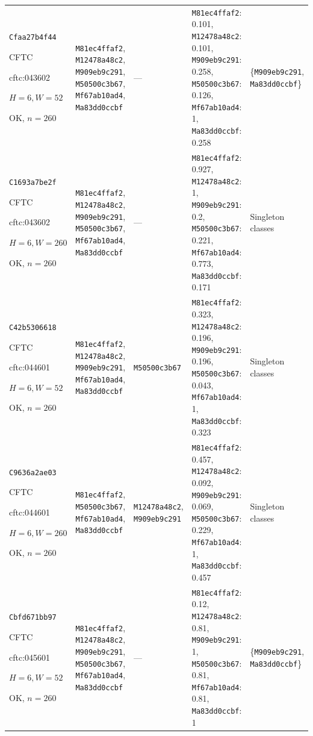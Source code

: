 \begin{longtable}{p{.15\linewidth}p{.17\linewidth}p{.17\linewidth}p{.25\linewidth}p{.14\linewidth}}
\texttt{Cfaa27b4f44}\par CFTC\par cftc:043602\par $H=6,W=52$\par OK, $n=260$ & \texttt{M81ec4ffaf2}, \texttt{M12478a48c2}, \texttt{M909eb9c291}, \texttt{M50500c3b67}, \texttt{Mf67ab10ad4}, \texttt{Ma83dd0ccbf} & --- & \texttt{M81ec4ffaf2}: 0.101, \texttt{M12478a48c2}: 0.101, \texttt{M909eb9c291}: 0.258, \texttt{M50500c3b67}: 0.126, \texttt{Mf67ab10ad4}: 1, \texttt{Ma83dd0ccbf}: 0.258 & \{\texttt{M909eb9c291}, \texttt{Ma83dd0ccbf}\} \\
\texttt{C1693a7be2f}\par CFTC\par cftc:043602\par $H=6,W=260$\par OK, $n=260$ & \texttt{M81ec4ffaf2}, \texttt{M12478a48c2}, \texttt{M909eb9c291}, \texttt{M50500c3b67}, \texttt{Mf67ab10ad4}, \texttt{Ma83dd0ccbf} & --- & \texttt{M81ec4ffaf2}: 0.927, \texttt{M12478a48c2}: 1, \texttt{M909eb9c291}: 0.2, \texttt{M50500c3b67}: 0.221, \texttt{Mf67ab10ad4}: 0.773, \texttt{Ma83dd0ccbf}: 0.171 & Singleton classes \\
\texttt{C42b5306618}\par CFTC\par cftc:044601\par $H=6,W=52$\par OK, $n=260$ & \texttt{M81ec4ffaf2}, \texttt{M12478a48c2}, \texttt{M909eb9c291}, \texttt{Mf67ab10ad4}, \texttt{Ma83dd0ccbf} & \texttt{M50500c3b67} & \texttt{M81ec4ffaf2}: 0.323, \texttt{M12478a48c2}: 0.196, \texttt{M909eb9c291}: 0.196, \texttt{M50500c3b67}: 0.043, \texttt{Mf67ab10ad4}: 1, \texttt{Ma83dd0ccbf}: 0.323 & Singleton classes \\
\texttt{C9636a2ae03}\par CFTC\par cftc:044601\par $H=6,W=260$\par OK, $n=260$ & \texttt{M81ec4ffaf2}, \texttt{M50500c3b67}, \texttt{Mf67ab10ad4}, \texttt{Ma83dd0ccbf} & \texttt{M12478a48c2}, \texttt{M909eb9c291} & \texttt{M81ec4ffaf2}: 0.457, \texttt{M12478a48c2}: 0.092, \texttt{M909eb9c291}: 0.069, \texttt{M50500c3b67}: 0.229, \texttt{Mf67ab10ad4}: 1, \texttt{Ma83dd0ccbf}: 0.457 & Singleton classes \\
\texttt{Cbfd671bb97}\par CFTC\par cftc:045601\par $H=6,W=52$\par OK, $n=260$ & \texttt{M81ec4ffaf2}, \texttt{M12478a48c2}, \texttt{M909eb9c291}, \texttt{M50500c3b67}, \texttt{Mf67ab10ad4}, \texttt{Ma83dd0ccbf} & --- & \texttt{M81ec4ffaf2}: 0.12, \texttt{M12478a48c2}: 0.81, \texttt{M909eb9c291}: 1, \texttt{M50500c3b67}: 0.81, \texttt{Mf67ab10ad4}: 0.81, \texttt{Ma83dd0ccbf}: 1 & \{\texttt{M909eb9c291}, \texttt{Ma83dd0ccbf}\} \\

\end{longtable}
